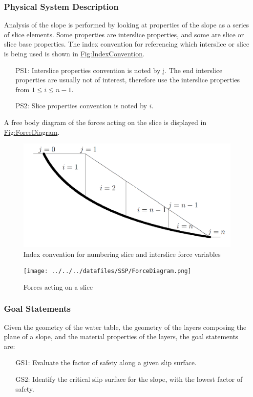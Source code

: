 \documentclass[12pt]{article}
\begin{document}
\subsubsection{Physical System Description}
\label{Sec:PhysSyst}
Analysis of the slope is performed by looking at properties of the slope as a series of slice elements. Some properties are interslice properties, and some are slice or slice base properties. The index convention for referencing which interslice or slice is being used is shown in \hyperref[Figure:IndexConvention]{Fig:IndexConvention}.
\begin{itemize}
\item[PS1:]Interslice properties convention is noted by j. The end interslice properties are usually not of interest, therefore use the interslice properties from $1\leq{}i\leq{}n-1$.
\item[PS2:]Slice properties convention is noted by $i$.
\end{itemize}
A free body diagram of the forces acting on the slice is displayed in \hyperref[Figure:ForceDiagram]{Fig:ForceDiagram}.
\begin{figure}
\begin{center}
\includegraphics[width=\textwidth]{../../../datafiles/SSP/IndexConvention.png}
\caption{Index convention for numbering slice and interslice force variables}
\label{Figure:IndexConvention}
\end{center}
\end{figure}
\begin{figure}
\begin{center}
\texttt{[image: ../../../datafiles/SSP/ForceDiagram.png]}
\caption{Forces acting on a slice}
\label{Figure:ForceDiagram}
\end{center}
\end{figure}
\subsubsection{Goal Statements}
\label{Sec:GoalStmt}
Given the geometry of the water table, the geometry of the layers composing the plane of a slope, and the material properties of the layers, the goal statements are:
\begin{itemize}
\item[GS1:]Evaluate the factor of safety along a given slip surface.
\item[GS2:]Identify the critical slip surface for the slope, with the lowest factor of safety.
\end{itemize}
\end{document}
